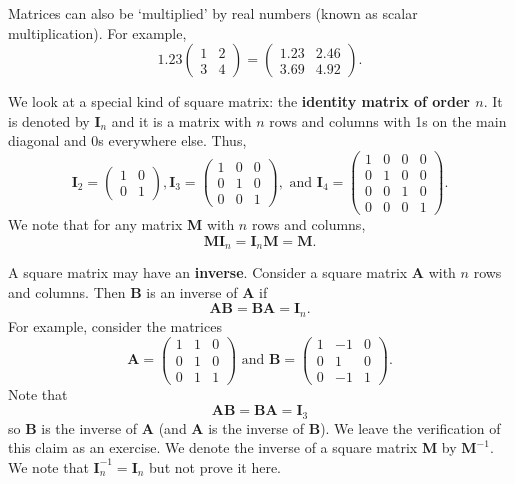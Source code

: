 Matrices can also be `multiplied' by real numbers (known as scalar multiplication). For example,
\[
    1.23\begin{pmatrix}1 & 2\\3 & 4\end{pmatrix} = \begin{pmatrix}1.23 & 2.46\\3.69 & 4.92\end{pmatrix}.
\]

We look at a special kind of square matrix: the \textbf{identity matrix of order $n$}. It is denoted by $\textbf{I}_n$ and it is a matrix with $n$ rows and columns with 1s on the main diagonal and 0s everywhere else. Thus,
\[
    \textbf{I}_2 = \begin{pmatrix}1 & 0\\0 & 1\end{pmatrix},
\textbf{I}_3 = \begin{pmatrix}1 & 0 & 0\\0 & 1 & 0\\0 & 0 & 1\end{pmatrix}, \text{ and }
\textbf{I}_4 = \begin{pmatrix}1 & 0 & 0 & 0\\0 & 1 & 0 & 0\\0 & 0 & 1 & 0\\0 & 0 & 0 & 1\end{pmatrix}.
\]
We note that for any matrix \textbf{M} with $n$ rows and columns,
\[
    \textbf{MI}_n = \textbf{I}_n\textbf{M} = \textbf{M}.
\]

A square matrix may have an \textbf{inverse}. Consider a square matrix \textbf{A} with $n$ rows and columns. Then \textbf{B} is an inverse of \textbf{A} if
\[
    \textbf{AB} = \textbf{BA} = \textbf{I}_n.
\]
For example, consider the matrices
\[
    \textbf{A} = \begin{pmatrix}1&1&0\\ 0&1&0\\ 0&1&1\end{pmatrix} \text{ and } \textbf{B} = \begin{pmatrix}1&-1&0\\ 0&1&0\\ 0&-1&1\end{pmatrix}.
\]
Note that
\[
    \textbf{AB} = \textbf{BA} = \textbf{I}_3
\]
so \textbf{B} is the inverse of \textbf{A} (and \textbf{A} is the inverse of \textbf{B}). We leave the verification of this claim as an exercise. We denote the inverse of a square matrix \textbf{M} by $\textbf{M}^{-1}$. We note that $\textbf{I}_n^{-1} = \textbf{I}_n$ but not prove it here.

